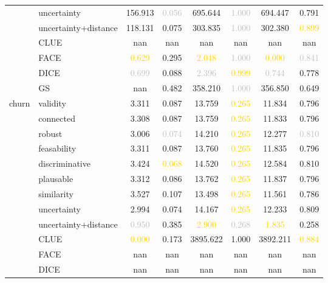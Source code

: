 \begin{table}[ht]
\begin{tabular}{l l c c c c c c}
 & uncertainty & 156.913 & \textcolor{silver}{0.056} & 695.644 & \textcolor{silver}{1.000} & 694.447 & \textcolor{bronze}{0.791} \\
 & uncertainty+distance & \textcolor{bronze}{118.131} & 0.075 & \textcolor{bronze}{303.835} & \textcolor{silver}{1.000} & \textcolor{bronze}{302.380} & \textcolor{gold}{0.899} \\
 & CLUE & nan & nan & nan & nan & nan & nan \\
 & FACE & \textcolor{gold}{0.629} & 0.295 & \textcolor{gold}{2.048} & \textcolor{silver}{1.000} & \textcolor{gold}{0.000} & \textcolor{silver}{0.841} \\
 & DICE & \textcolor{silver}{0.699} & 0.088 & \textcolor{silver}{2.396} & \textcolor{gold}{0.999} & \textcolor{silver}{0.744} & 0.778 \\
 & GS & nan & 0.482 & 358.210 & \textcolor{silver}{1.000} & 356.850 & 0.649 \\
\hline
\multirow{13}{*}{churn} & validity & 3.311 & 0.087 & 13.759 & \textcolor{gold}{0.265} & 11.834 & 0.796 \\
 & connected & 3.308 & 0.087 & 13.759 & \textcolor{gold}{0.265} & 11.833 & 0.796 \\
 & robust & 3.006 & \textcolor{silver}{0.074} & 14.210 & \textcolor{gold}{0.265} & 12.277 & \textcolor{silver}{0.810} \\
 & feasability & 3.311 & 0.087 & 13.760 & \textcolor{gold}{0.265} & 11.835 & 0.796 \\
 & discriminative & 3.424 & \textcolor{gold}{0.068} & 14.520 & \textcolor{gold}{0.265} & 12.584 & \textcolor{bronze}{0.810} \\
 & plausable & 3.312 & 0.086 & 13.762 & \textcolor{gold}{0.265} & 11.837 & 0.796 \\
 & similarity & 3.527 & 0.107 & \textcolor{bronze}{13.498} & \textcolor{gold}{0.265} & \textcolor{bronze}{11.561} & 0.786 \\
 & uncertainty & 2.994 & \textcolor{bronze}{0.074} & 14.167 & \textcolor{gold}{0.265} & 12.233 & 0.809 \\
 & uncertainty+distance & \textcolor{silver}{0.950} & 0.385 & \textcolor{gold}{2.900} & \textcolor{silver}{0.268} & \textcolor{gold}{1.835} & 0.258 \\
 & CLUE & \textcolor{gold}{0.000} & 0.173 & 3895.622 & 1.000 & 3892.211 & \textcolor{gold}{0.884} \\
 & FACE & nan & nan & nan & nan & nan & nan \\
 & DICE & nan & nan & nan & nan & nan & nan \\

\end{tabular}
\end{table}
